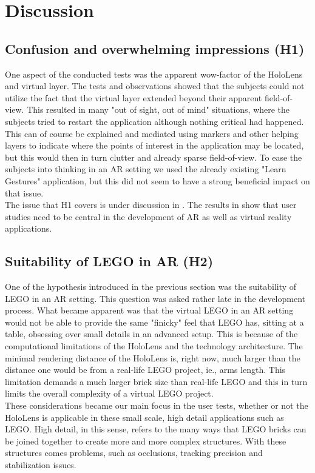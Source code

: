 
\section{Discussion}

\subsection{Confusion and overwhelming impressions (H1)}
One aspect of the conducted tests was the apparent wow-factor of the HoloLens and virtual layer. The tests and observations showed that the subjects could not utilize the fact that the virtual layer extended beyond their apparent field-of-view. This resulted in many "out of sight, out of mind" situations, where the subjects tried to restart the application although nothing critical had happened. This can of course be explained and mediated using markers and other helping layers to indicate where the points of interest in the application may be located, but this would then in turn clutter and already sparse field-of-view. To ease the subjects into thinking in an AR setting we used the already existing "Learn Gestures" application, but this did not seem to have a strong beneficial impact on that issue.\\
The issue that H1 covers is under discussion in \cite{kim}. The results in \cite{kim} show that user studies need to be central in the development of AR as well as virtual reality applications. 

\subsection{Suitability of LEGO in AR (H2)}
One of the hypothesis introduced in the previous section was the suitability of LEGO in an AR setting. This question was asked rather late in the development process. What became apparent was that the virtual LEGO in an AR setting would not be able to provide the same "finicky" feel that LEGO has, sitting at a table, obsessing over small details in an advanced setup. This is because of the computational limitations of the HoloLens and the technology architecture. The minimal rendering distance of the HoloLens is, right now, much larger than the distance one would be from a real-life LEGO project, ie., arms length. This limitation demands a much larger brick size than real-life LEGO and this in turn limits the overall complexity of a virtual LEGO project. \\
These considerations became our main focus in the user tests, whether or not the HoloLens is applicable in these small scale, high detail applications such as LEGO. High detail, in this sense, refers to the many ways that LEGO bricks can be joined together to create more and more complex structures. With these structures comes problems, such as occlusions, tracking precision and stabilization issues. 